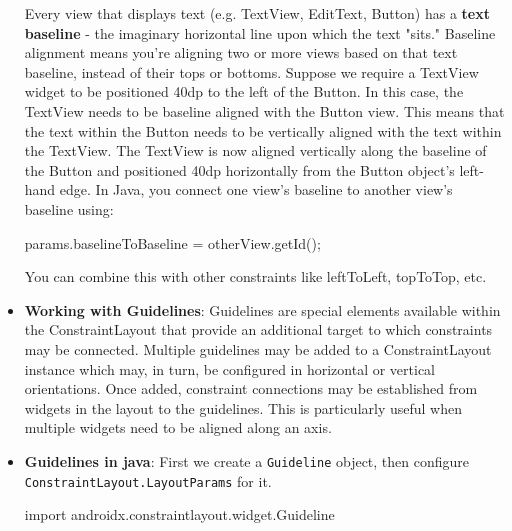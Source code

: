 \documentclass{report}
\begin{document}
\begin{itemize}
            \bigbreak \noindent 
            Every view that displays text (e.g. TextView, EditText, Button) has a \textbf{text baseline} - the imaginary horizontal line upon which the text "sits."
            \bigbreak \noindent 
            Baseline alignment means you’re aligning two or more views based on that text baseline, instead of their tops or bottoms.
            \bigbreak \noindent 
            Suppose we require a TextView widget to be positioned 40dp to the left of the Button. 
            \bigbreak \noindent 
            In this case, the TextView needs to be baseline aligned with the Button view.
            \bigbreak \noindent 
            This means that the text within the Button needs to be vertically aligned with the text within the TextView.
            \bigbreak \noindent 
            \bigbreak \noindent 
            The TextView is now aligned vertically along the baseline of the Button and positioned 40dp horizontally from the Button object’s left-hand edge.
            \bigbreak \noindent 
            In Java, you connect one view’s baseline to another view’s baseline using:
            \bigbreak \noindent 
            \begin{javacode}
            params.baselineToBaseline = otherView.getId();
            \end{javacode}
            \bigbreak \noindent 
            You can combine this with other constraints like leftToLeft, topToTop, etc.
        \item \textbf{Working with Guidelines}: Guidelines are special elements available within the ConstraintLayout that provide an additional target to which constraints may be connected.
            \bigbreak \noindent 
            Multiple guidelines may be added to a ConstraintLayout instance which may, in turn, be configured in horizontal or vertical orientations.
            \bigbreak \noindent 
            Once added, constraint connections may be established from widgets in the layout to the guidelines. This is particularly useful when multiple widgets need to be aligned along an axis. 
            \bigbreak \noindent 
        \item \textbf{Guidelines in java}: First we create a \texttt{Guideline} object, then configure \texttt{ConstraintLayout.LayoutParams} for it.
            \bigbreak \noindent 
            \begin{javacode}
                import androidx.constraintlayout.widget.Guideline 


\end{javacode}
\end{itemize}
\end{document}
